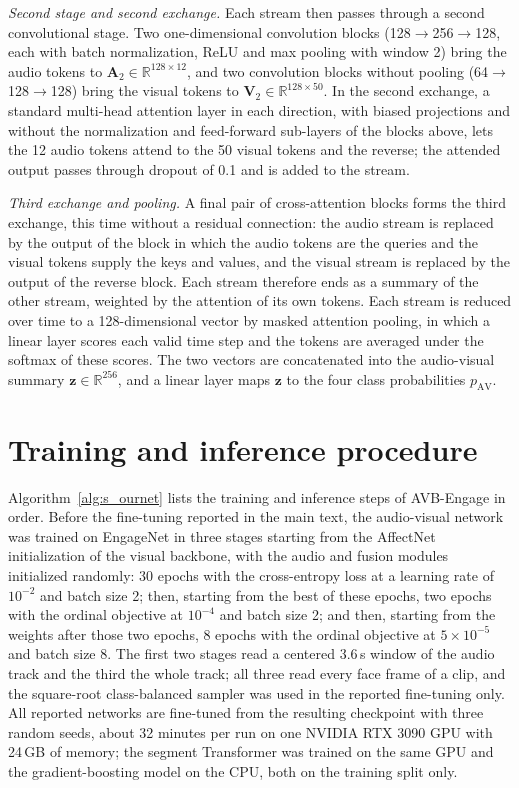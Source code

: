 \documentclass[pdflatex,sn-basic]{sn-jnl}
\newcommand{\ournet}{AVB-Engage}
\begin{document}
\emph{Second stage and second exchange.} Each stream then passes through a second convolutional stage. Two one-dimensional convolution blocks (128$\to$256$\to$128, each with batch normalization, ReLU and max pooling with window 2) bring the audio tokens to $\mathbf{A}_2 \in \mathbb{R}^{128 \times 12}$, and two convolution blocks without pooling (64$\to$128$\to$128) bring the visual tokens to $\mathbf{V}_2 \in \mathbb{R}^{128 \times 50}$. In the second exchange, a standard multi-head attention layer in each direction, with biased projections and without the normalization and feed-forward sub-layers of the blocks above, lets the 12 audio tokens attend to the 50 visual tokens and the reverse; the attended output passes through dropout of 0.1 and is added to the stream.

\emph{Third exchange and pooling.} A final pair of cross-attention blocks forms the third exchange, this time without a residual connection: the audio stream is replaced by the output of the block in which the audio tokens are the queries and the visual tokens supply the keys and values, and the visual stream is replaced by the output of the reverse block. Each stream therefore ends as a summary of the other stream, weighted by the attention of its own tokens. Each stream is reduced over time to a 128-dimensional vector by masked attention pooling, in which a linear layer scores each valid time step and the tokens are averaged under the softmax of these scores. The two vectors are concatenated into the audio-visual summary $\mathbf{z} \in \mathbb{R}^{256}$, and a linear layer maps $\mathbf{z}$ to the four class probabilities $p_{\mathrm{AV}}$.

\section{Training and inference procedure}\label{sec:s_alg}

Algorithm~\ref{alg:s_ournet} lists the training and inference steps of \ournet{} in order. Before the fine-tuning reported in the main text, the audio-visual network was trained on EngageNet in three stages starting from the AffectNet initialization of the visual backbone, with the audio and fusion modules initialized randomly: 30 epochs with the cross-entropy loss at a learning rate of $10^{-2}$ and batch size 2; then, starting from the best of these epochs, two epochs with the ordinal objective at $10^{-4}$ and batch size 2; and then, starting from the weights after those two epochs, 8 epochs with the ordinal objective at $5 \times 10^{-5}$ and batch size 8. The first two stages read a centered 3.6\,s window of the audio track and the third the whole track; all three read every face frame of a clip, and the square-root class-balanced sampler was used in the reported fine-tuning only. All reported networks are fine-tuned from the resulting checkpoint with three random seeds, about 32 minutes per run on one NVIDIA RTX 3090 GPU with 24\,GB of memory; the segment Transformer was trained on the same GPU and the gradient-boosting model on the CPU, both on the training split only.
\end{document}
